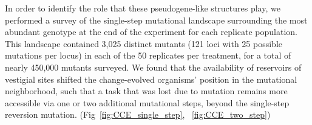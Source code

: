 \documentclass[PhD]{msu-thesis}
\begin{document}
In order to identify the role that these pseudogene-like structures play, we performed a survey of the single-step mutational landscape surrounding the most abundant genotype at the end of the experiment for each replicate population. This landscape contained 3,025 distinct mutants (121 loci with 25 possible mutations per locus) in each of the 50 replicates per treatment, for a total of nearly 450,000 mutants surveyed. We found that the availability of reservoirs of vestigial sites shifted the change-evolved organisms' position in the mutational neighborhood, such that a task that was lost due to mutation remains more accessible via one or two additional mutational steps, beyond the single-step reversion mutation. (Fig~\ref{fig:CCE_single_step}, ~\ref{fig:CCE_two_step})
\end{document}
